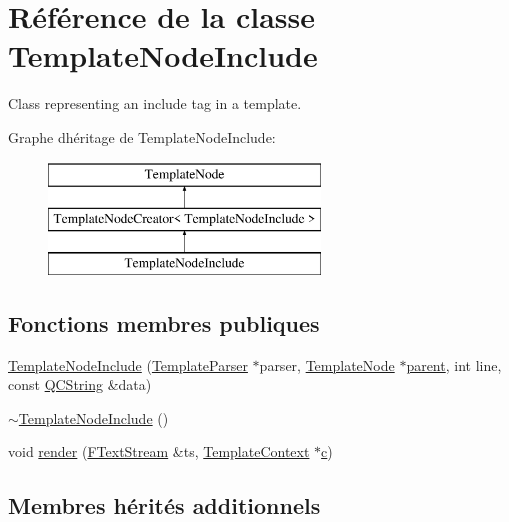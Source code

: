 \hypertarget{class_template_node_include}{}\section{Référence de la classe Template\+Node\+Include}
\label{class_template_node_include}


Class representing an \textquotesingle{}include\textquotesingle{} tag in a template.  


Graphe d\textquotesingle{}héritage de Template\+Node\+Include\+:\begin{figure}[H]
\begin{center}
\leavevmode
\includegraphics[height=3.000000cm]{class_template_node_include}
\end{center}
\end{figure}
\subsection*{Fonctions membres publiques}
\begin{DoxyCompactItemize}
\item 
\hyperlink{class_template_node_include_a7c581fbb5dd87f333ad1c716243e2d9d}{Template\+Node\+Include} (\hyperlink{class_template_parser}{Template\+Parser} $\ast$parser, \hyperlink{class_template_node}{Template\+Node} $\ast$\hyperlink{class_template_node_a69a306ef84e62af9fe57bf9aacc94536}{parent}, int line, const \hyperlink{class_q_c_string}{Q\+C\+String} \&data)
\item 
\hyperlink{class_template_node_include_a907785257c250db6a1f4be01544cc081}{$\sim$\+Template\+Node\+Include} ()
\item 
void \hyperlink{class_template_node_include_ad97559b461725ed3b3e7672eb16932c1}{render} (\hyperlink{class_f_text_stream}{F\+Text\+Stream} \&ts, \hyperlink{class_template_context}{Template\+Context} $\ast$\hyperlink{060__command__switch_8tcl_ab14f56bc3bd7680490ece4ad7815465f}{c})
\end{DoxyCompactItemize}
\subsection*{Membres hérités additionnels}


